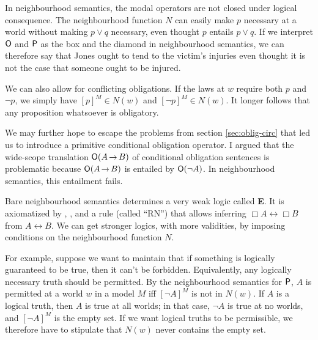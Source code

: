 In neighbourhood semantics, the modal operators are not closed under logical
consequence. The neighbourhood function $N$ can easily make $p$ necessary at a
world without making $p\lor q$ necessary, even thought $p$ entails $p \lor q$.
If we interpret $\operatorname{\mathsf{O}}$ and $\operatorname{\mathsf{P}}$ as the box and the diamond in neighbourhood
semantics, we can therefore say that Jones ought to tend to the victim's
injuries even thought it is not the case that someone ought to be injured.


We can also allow for conflicting obligations. If the laws at $w$ require both
$p$ and $\neg p$, we simply have $[p]^M \in N(w)$ and $[\neg p]^M \in N(w)$. It
longer follows that any proposition whatsoever is obligatory.

We may further hope to escape the problems from section \ref{sec:oblig-circ}
that led us to introduce a primitive conditional obligation operator. I argued
that the wide-scope translation $\Ob(A \to B)$ of conditional obligation
sentences is problematic because $\Ob(A \to B)$ is entailed by $\operatorname{\mathsf{O}}(\neg A)$. In
neighbourhood semantics, this entailment fails. 

Bare neighbourhood semantics determines a very weak logic called \textbf{E}. It
is axiomatized by , , and a rule (called ``RN'') that allows
inferring $\Box A \leftrightarrow \Box B$ from $A \leftrightarrow B$. We can get
stronger logics, with more validities, by imposing conditions on the
neighbourhood function $N$.

For example, suppose we want to maintain that if something is logically
guaranteed to be true, then it can't be forbidden. Equivalently, any logically
necessary truth should be permitted. By the neighbourhood semantics for $\operatorname{\mathsf{P}}$,
$A$ is permitted at a world $w$ in a model $M$ iff $[\neg A]^M$ is not in
$N(w)$. If $A$ is a logical truth, then $A$ is true at all worlds; in that case,
$\neg A$ is true at no worlds, and $[\neg A]^M$ is the empty set. If we want
logical truths to be permissible, we therefore have to stipulate that $N(w)$
never contains the empty set.

